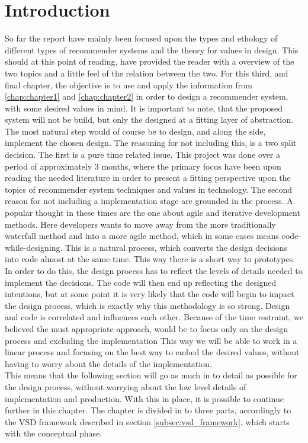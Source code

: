 \section{Introduction}
So far the report have mainly been focused upon the types and ethology of different types of recommender systems and the theory for values in design. This should at this point of reading, have provided the reader with a overview of the two topics and a little feel of the relation between the two. For this third, and final chapter, the objective is to use and apply the information from \ref{chap:chapter1} and \ref{chap:chapter2} in order to design a recommender system, with some desired values in mind. It is important to note, that the proposed system will not be build, but only the designed at a fitting layer of abstraction. The most natural step would of course be to design, and along the side, implement the chosen design. The reasoning for not including this, is a two split decision. The first is a pure time related issue. This project was done over a period of approximately 3 months, where the primary focus have been upon reading the needed literature in order to present a fitting perspective upon the topics of recommender system techniques and values in technology. The second reason for not including a implementation stage are grounded in the process. A popular thought in these times are the one about agile and iterative development methods. Here developers wants to move away from the more traditionally waterfall method and into a more agile method, which in some cases means code-while-designing. This is a natural process, which converts the design decisions into code almost at the same time. This way there is a short way to prototypes. In order to do this, the design process has to reflect the levels of details needed to implement the decisions. The code will then end up reflecting the designed intentions, but at some point it is very likely that the code will begin to impact the design process, which is exactly why this methodology is so strong. Design and code is correlated and influences each other. Because of the time restraint, we believed the must appropriate approach, would be to focus only on the design process and excluding the implementation This way we will be able to work in a linear process and focusing on the best way to embed the desired values, without having to worry about the details of the implementation.\\
This means that the following section will go as much in to detail as possible for the design process, without worrying about the low level details of implementation and production. 
With this in place, it is possible to continue further in this chapter. The chapter is divided in to three parts, accordingly to the VSD framework described in section \ref{subsec:vsd_framework}, which starts with the conceptual phase.
